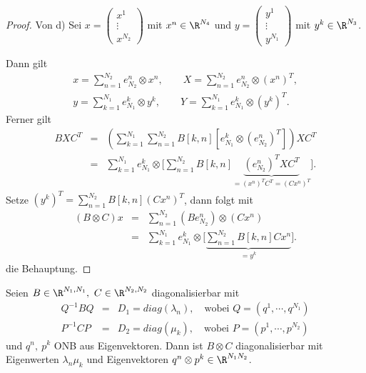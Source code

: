 \begin{proof}
    Von d) Sei $x = \left(\begin{smallmatrix}
                      x^1 \\
                      \vdots \\
                      x^{N_2}
                    \end{smallmatrix}\right)$
    mit $x^n\in \R^{N_4}$ und $y = \left(\begin{smallmatrix}
                                      y^1 \\
                                      \vdots \\
                                      y^{N_1}
                                    \end{smallmatrix}\right)$
    mit $y^k\in \R^{N_3}$.

    Dann gilt
    \begin{eqnarray*}
        x = \sum_{n=1}^{N_2} e^n_{N_2} \otimes x^n, \qquad
        X = \sum_{n=1}^{N_2} e^n_{N_2} \otimes (x^n)^T, \\
        y = \sum_{k=1}^{N_1} e^k_{N_1} \otimes y^k, \qquad
        Y = \sum_{k=1}^{N_1} e^k_{N_1} \otimes (y^k)^T.
    \end{eqnarray*}
    Ferner gilt
    \begin{eqnarray*}
            B X C^T
        &=& \left(\sum_{k=1}^{N_1} \sum_{n=1}^{N_2} B[k, n] \left[e^k_{N_1}
            \otimes \left(e^n_{N_2}\right)^T\right]\right) X C^T \\
        &=& \sum_{k=1}^{N_1} e^k_{N_1} \otimes \Biggl[\sum_{n=1}^{N_2} B[k, n]
            \underbrace{\left(e^n_{N_2}\right)^T X C^T}
            _{= \left(x^n\right)^T C^T = \left(C x^n\right)^T}\Biggr].
    \end{eqnarray*}
    Setze $(y^k)^T = \sum_{n=1}^{N_2} B[k, n] (C x^n)^T$,
    dann folgt mit
    \begin{eqnarray*}
            (B \otimes C) x
        &=& \sum_{n=1}^{N_2} \left(B e^n_{N_2}\right) \otimes (C x^n) \\
        &=& \sum_{k=1}^{N_1} e^k_{N_1} \otimes
            \Biggl[\underbrace{\sum_{n=1}^{N_2} B[k, n] C x^n}_{= y^k}\Biggr].
    \end{eqnarray*}
    die Behauptung.
\end{proof}


\begin{Lemma}
    \label{lem:2.10}
    Seien $B \in \R^{N_1, N_1}, \ C \in \R^{N_2, N_2}$ diagonalisierbar mit
    \begin{eqnarray*}
        Q^{-1} B Q &=& D_1 = diag(\lambda_n),
        \quad \text{wobei }
        Q = (q^1, \cdots, q^{N_1}) \\
        P^{-1} C P &=& D_2 = diag(\mu_k),
        \quad \text{wobei }
        P = (p^1, \cdots, p^{N_2})
    \end{eqnarray*}
    und $q^n, \ p^k$ ONB aus Eigenvektoren.
    Dann ist $B \otimes C$ diagonalisierbar mit Eigenwerten
    $\lambda_n \mu_k$ und Eigenvektoren $q^n \otimes p^k \in \R^{N_1 N_2}$.
\end{Lemma}


